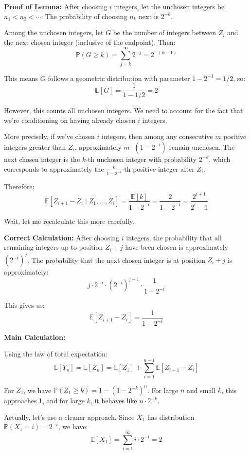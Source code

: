 \documentclass[12pt,a4paper]{article}
\theoremstyle{definition}
\begin{document}
        \textbf{Proof of Lemma:} After choosing $i$ integers, let the unchosen integers be $n_1 < n_2 < \cdots$. The probability of choosing $n_k$ next is $2^{-k}$.

        Among the unchosen integers, let $G$ be the number of integers between $Z_i$ and the next chosen integer (inclusive of the endpoint). Then:
        $$\mathbb{P}(G \geq k) = \sum_{j=k}^{\infty} 2^{-j} = 2^{-(k-1)}$$

        This means $G$ follows a geometric distribution with parameter $1 - 2^{-1} = 1/2$, so:
        $$\mathbb{E}[G] = \frac{1}{1 - 1/2} = 2$$

        However, this counts all unchosen integers. We need to account for the fact that we're conditioning on having already chosen $i$ integers.

        More precisely, if we've chosen $i$ integers, then among any consecutive $m$ positive integers greater than $Z_i$, approximately $m \cdot (1 - 2^{-i})$ remain unchosen. The next chosen integer is the $k$-th unchosen integer with probability $2^{-k}$, which corresponds to approximately the $\frac{k}{1 - 2^{-i}}$-th positive integer after $Z_i$.

        Therefore:
        $$\mathbb{E}[Z_{i+1} - Z_i \mid Z_1, \ldots, Z_i] = \frac{\mathbb{E}[k]}{1 - 2^{-i}} = \frac{2}{1 - 2^{-i}} = \frac{2^{i+1}}{2^i - 1}$$

        Wait, let me recalculate this more carefully.

        \textbf{Correct Calculation:} After choosing $i$ integers, the probability that all remaining integers up to position $Z_i + j$ have been chosen is approximately $(2^{-i})^j$. The probability that the next chosen integer is at position $Z_i + j$ is approximately:
        $$j \cdot 2^{-i} \cdot (2^{-i})^{j-1} \cdot \frac{1}{1 - 2^{-i}}$$

        This gives us:
        $$\mathbb{E}[Z_{i+1} - Z_i] = \frac{1}{1 - 2^{-i}}$$

        \textbf{Main Calculation:}

        Using the law of total expectation:
        $$\mathbb{E}[Y_n] = \mathbb{E}[Z_n] = \mathbb{E}[Z_1] + \sum_{i=1}^{n-1} \mathbb{E}[Z_{i+1} - Z_i]$$

        For $Z_1$, we have $\mathbb{P}(Z_1 \geq k) = 1 - (1-2^{-k})^n$. For large $n$ and small $k$, this approaches 1, and for large $k$, it behaves like $n \cdot 2^{-k}$.

        Actually, let's use a cleaner approach. Since $X_1$ has distribution $\mathbb{P}(X_1 = i) = 2^{-i}$, we have:
        $$\mathbb{E}[X_1] = \sum_{i=1}^{\infty} i \cdot 2^{-i} = 2$$
\end{document}
